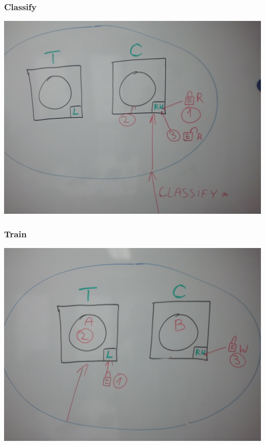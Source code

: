 \documentclass{beamer}
\begin{document}
\begin{frame}
\frametitle{Classify}
\begin{center}
\includegraphics[scale=0.1]{classify.jpg} 
\end{center}
\end{frame}

\begin{frame}
\frametitle{Train}
\begin{center}
\includegraphics[scale=0.1]{train1.jpg} 
\end{center}
\end{frame}
\end{document}
